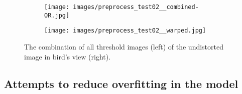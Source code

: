 \documentclass[a4paper, 11pt, DIV=14]{scrartcl}
\begin{document}
\begin{figure}[h]
    \centering
    \begin{subfigure}{0.45\textwidth}
        \texttt{[image: images/preprocess\_test02\_\_combined-OR.jpg]}
    \end{subfigure}\quad
    \begin{subfigure}{0.45\textwidth}
        \texttt{[image: images/preprocess\_test02\_\_warped.jpg]}
    \end{subfigure} 
    \caption{The combination of all threshold images (left) of the undistorted image in bird's view (right).}
    \label{fig:threshold_final}
\end{figure}

\subsection{Attempts to reduce overfitting in the model}





\printbibliography
\end{document}
